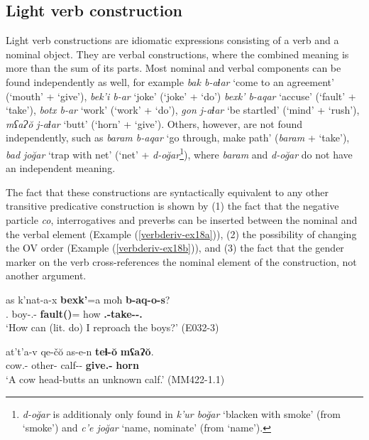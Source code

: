 \subsection{Light verb construction} \label{lvconstr}


Light verb constructions are idiomatic expressions consisting of a verb and a nominal object. They are verbal constructions, where the combined meaning is more than the sum of its parts. Most nominal and verbal components can be found independently as well, for example \textit{bak b-aɬar} `come to an agreement' (`mouth' + `give'), \textit{bek'i b-ar} `joke' (`joke' + `do') \textit{bexk' b-aqar} `accuse' (`fault' + `take'), \textit{botx b-ar} `work' (`work' + `do'), \textit{gon j-aɬar} `be startled' (`mind' + `rush'), \textit{mʕaɁ\u{o} j-aɬar} `butt' (`horn' + `give'). Others, however, are not found independently, such as \textit{baram b-aqar} `go through, make path' (\textit{baram} + `take'), \textit{bad jo\u{g}ar} `trap with net' (`net' + \textit{d-o\u{g}ar}\footnote{\textit{d-o\u{g}ar} is additionaly only found in \textit{k'ur bo\u{g}ar} `blacken with smoke' (from  `smoke') and \textit{c'e jo\u{g}ar} `name, nominate' (from `name').}), where \textit{baram} and \textit{d-o\u{g}ar} do not have an independent meaning. 

The fact that these constructions are syntactically equivalent to any other transitive predicative construction is shown by (1) the fact that the negative particle \textit{co}, interrogatives and preverbs can be inserted between the nominal and the verbal element (Example (\ref{verbderiv-ex18a})), (2) the possibility of changing the OV order (Example (\ref{verbderiv-ex18b})), and (3) the fact that the gender marker on the verb cross-references the nominal element of the construction, not another argument.



\begin{exe}
	\ex\label{verbderiv-ex18}
	\begin{xlist}
		
		
			\ex\label{verbderiv-ex18a}
			\gll  as k'nat-a-x \textbf{bexk'}=a moħ \textbf{b-aq-o-s}? \\
			{\Fsg}.{\Erg} boy-{\Obl}.{\Pl}-{\Cont} \textbf{fault({\B})}={\Emph} how \textbf{{\B}.{\Sg}-take-{\Npst}-{\Fsg}.{\Erg}} \\
			\trans `How can (lit. do) I reproach the boys?'
			\hfill (E032-3)
		
		
		
			\ex\label{verbderiv-ex18b}
			\gll at't'a-v qe-č\u{o} as-e-n \textbf{teɬ-\u{o}} \textbf{mʕaɁ\u{o}}.  \\
			cow.{\Obl}-{\Erg} other-{\Obl} calf-{\Obl}-{\Dat} \textbf{give.{\Ipfv}-{\Npst}} \textbf{horn} \\
			\trans `A cow head-butts an unknown calf.'
			\hfill (MM422-1.1)
		
		
		
	\end{xlist}
\end{exe}

